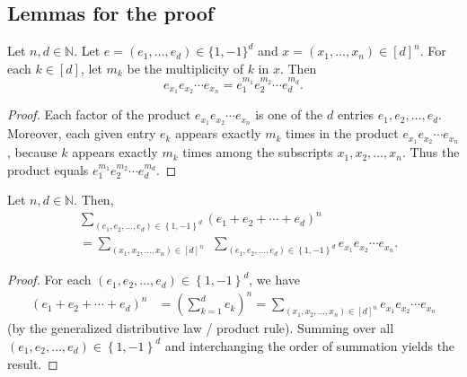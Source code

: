 \subsection{Lemmas for the proof}

\begin{lemma}
\label{lem.cancel.all-even.signProduct-eq-prod-pow}
\leanhelper
\leanok
Let $n,d\in\mathbb{N}$. Let $e = (e_1, \ldots, e_d) \in \{1,-1\}^d$ and
$x = (x_1, \ldots, x_n) \in [d]^n$. For each $k \in [d]$, let $m_k$ be
the multiplicity of $k$ in $x$. Then
\[
e_{x_{1}}e_{x_{2}}\cdots e_{x_{n}}=e_{1}^{m_{1}}e_{2}^{m_{2}}\cdots
e_{d}^{m_{d}}.
\]
\end{lemma}

\begin{proof}
\leanok
Each factor of the product $e_{x_{1}}e_{x_{2}}\cdots e_{x_{n}}$ is one of the $d$
entries $e_{1},e_{2},\ldots,e_{d}$. Moreover, each given
entry $e_{k}$ appears exactly $m_{k}$ times in the product $e_{x_{1}}e_{x_{2}%
}\cdots e_{x_{n}}$, because $k$ appears exactly $m_{k}$ times among the
subscripts $x_{1},x_{2},\ldots,x_{n}$. Thus the
product equals $e_{1}^{m_{1}}e_{2}^{m_{2}}\cdots e_{d}^{m_{d}}$.
\end{proof}

\begin{lemma}
\label{lem.cancel.all-even.l1}
\leantarget
\leanok
Let $n,d\in\mathbb{N}$. Then,
\begin{align*}
&  \sum_{\left(  e_{1},e_{2},\ldots,e_{d}\right)  \in\left\{  1,-1\right\}
^{d}}\left(  e_{1}+e_{2}+\cdots+e_{d}\right)  ^{n}\\
&  =\sum_{\left(  x_{1},x_{2},\ldots,x_{n}\right)  \in\left[  d\right]  ^{n}%
}\ \ \sum_{\left(  e_{1},e_{2},\ldots,e_{d}\right)  \in\left\{  1,-1\right\}
^{d}}e_{x_{1}}e_{x_{2}}\cdots e_{x_{n}}.
\end{align*}
\end{lemma}

\begin{proof}
\leanok
For each $\left(  e_{1},e_{2},\ldots,e_{d}\right)  \in\left\{  1,-1\right\}
^{d}$, we have
\begin{align*}
\left(  e_{1}+e_{2}+\cdots+e_{d}\right)  ^{n}
&  =\left(  \sum_{k=1}^{d}e_{k}\right)  ^{n}
=\sum_{\left(  x_{1},x_{2},\ldots,x_{n}\right)  \in\left[
d\right]  ^{n}}e_{x_{1}}e_{x_{2}}\cdots e_{x_{n}}
\end{align*}
(by the generalized distributive law / product rule).
Summing over all $\left(
e_{1},e_{2},\ldots,e_{d}\right)  \in\left\{  1,-1\right\}  ^{d}$ and
interchanging the order of summation yields the result.
\end{proof}

